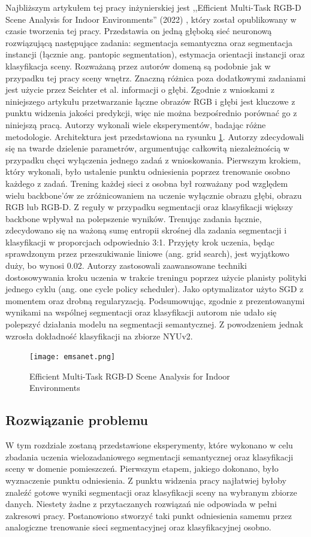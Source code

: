 Najbliższym artykułem tej pracy inżynierskiej jest ,,Efficient Multi-Task RGB-D Scene Analysis for Indoor Environments'' (2022) \cite{9892852}, który został opublikowany w czasie tworzenia tej pracy. Przedstawia on jedną głęboką sieć neuronową rozwiązującą następujące zadania: segmentacja semantyczna oraz segmentacja instancji (łącznie ang. pantopic segmentation), estymacja orientacji instancji oraz klasyfikacja sceny. Rozważaną przez autorów domeną są podobnie jak w przypadku tej pracy sceny wnętrz. Znaczną różnica poza dodatkowymi zadaniami jest użycie przez Seichter et al. informacji o głębi. Zgodnie z wnioskami z niniejszego artykułu przetwarzanie łączne obrazów RGB i głębi jest kluczowe z punktu widzenia jakości predykcji, więc nie można bezpośrednio porównać go z niniejszą pracą. Autorzy wykonali wiele eksperymentów, badając różne metodologie. Architektura jest przedstawiona na rysunku \ref{fig:emsanet}. Autorzy zdecydowali się na twarde dzielenie parametrów, argumentując całkowitą niezależnością w przypadku chęci wyłączenia jednego zadań z wnioskowania. Pierwszym krokiem, który wykonali, było ustalenie punktu odniesienia poprzez trenowanie osobno każdego z zadań. Trening każdej sieci z osobna był rozważany pod względem wielu backbone'ów ze zróżnicowaniem na uczenie wyłącznie obrazu głębi, obrazu RGB lub RGB-D. Z reguły w przypadku segmentacji oraz klasyfikacji większy backbone wpływał na polepszenie wyników. Trenując zadania łącznie, zdecydowano się na ważoną sumę entropii skrośnej dla zadania segmentacji i klasyfikacji w proporcjach odpowiednio 3:1. Przyjęty krok uczenia, będąc sprawdzonym przez przeszukiwanie liniowe (ang. grid search), jest wyjątkowo duży, bo wynosi 0.02. Autorzy zastosowali zaawansowane techniki dostosowywania kroku uczenia w trakcie treningu poprzez użycie planisty polityki jednego cyklu (ang. one cycle policy scheduler). Jako optymalizator użyto SGD z momentem oraz drobną regularyzacją. Podsumowując, zgodnie z prezentowanymi wynikami na wspólnej segmentacji oraz klasyfikacji autorom nie udało się polepszyć działania modelu na segmentacji semantycznej. Z powodzeniem jednak wzrosła dokładność klasyfikacji na zbiorze NYUv2.

\begin{figure}[ht!]
    \centering
    \texttt{[image: emsanet.png]}
    \caption{Efficient Multi-Task RGB-D Scene Analysis for Indoor Environments \cite{9892852}}
    \label{fig:emsanet}
\end{figure}


\subsection{Rozwiązanie problemu}
W tym rozdziale zostaną przedstawione eksperymenty, które wykonano w celu zbadania uczenia wielozadaniowego segmentacji semantycznej oraz klasyfikacji sceny w domenie pomieszczeń. Pierwszym etapem, jakiego dokonano, było wyznaczenie punktu odniesienia. Z punktu widzenia pracy najłatwiej byłoby znaleźć gotowe wyniki segmentacji oraz klasyfikacji sceny na wybranym zbiorze danych. Niestety żadne z przytaczanych rozwiązań nie odpowiada w pełni zakresowi pracy. Postanowiono stworzyć taki punkt odniesienia samemu przez analogiczne trenowanie sieci segmentacyjnej oraz klasyfikacyjnej osobno.

